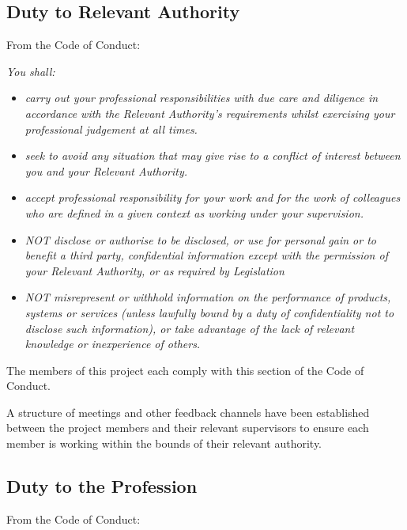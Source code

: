 \documentclass[a4paper]{report}
\begin{document}
\subsection*{Duty to Relevant Authority}

From the Code of Conduct: \cite{CoC}

\textit{You shall:}
\begin{itemize}
\item \textit{carry out your professional responsibilities with due care and diligence in accordance with the Relevant Authority’s requirements whilst exercising your professional judgement at all times.}
\item \textit{seek to avoid any situation that may give rise to a conflict of interest between you and your Relevant Authority.}
\item \textit{accept professional responsibility for your work and for the work of colleagues who are defined in a given context as working under your supervision.}
\item \textit{NOT disclose or authorise to be disclosed, or use for personal gain or to benefit a third party, confidential information except with the permission of your Relevant Authority, or as required by Legislation}
\item \textit{NOT misrepresent or withhold information on the performance of products, systems or services (unless lawfully bound by a duty of confidentiality not to disclose such information), or take advantage of the lack of relevant knowledge or inexperience of others. }
\end{itemize}

The members of this project each comply with this section of the Code of Conduct.

A structure of meetings and other feedback channels have been established between the project members and their relevant supervisors to ensure each member is working within the bounds of their relevant authority.

\subsection*{Duty to the Profession}

From the Code of Conduct: \cite{CoC}
\end{document}
